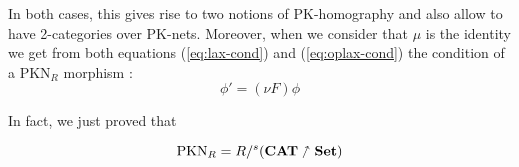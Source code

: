 In both cases, this gives rise to two notions of PK-homography and also allow to have 2-categories over PK-nets. Moreover, when we consider that $\mu$ is the identity we get from both equations (\ref{eq:lax-cond}) and (\ref{eq:oplax-cond}) the condition of a $\text{PKN}_R$ morphism :
$$\phi' = (\nu F)\phi$$

In fact, we just proved that
\begin{thm}
    $$\text{PKN}_R = R /^s (\bf CAT\nnearrow Set)$$
\end{thm}



